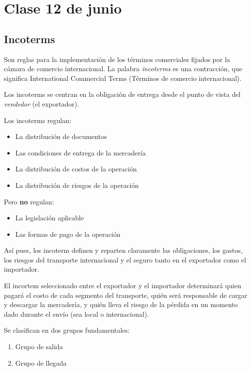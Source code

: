 \section{Clase 12 de junio}

\subsection{Incoterms}

Son reglas para la implementación de los términos comerciales
fijados por la cámara de comercio internacional. 
La palabra \textit{incoterms} es una contracción,
que significa International Commercial Terms
(Términos de comercio internacional).

Los incoterms se centran en la obligación de entrega desde el punto de vista del
\textit{vendedor} (el exportador).

Los incoterms regulan:
\begin{itemize}
      \item La distribución de documentos
      \item Las condiciones de entrega de la mercadería
      \item La distribución de costos de la operación
      \item La distribución de riesgos de la operación 
\end{itemize}

Pero \textbf{no} regulan:
\begin{itemize}
      \item La legislación aplicable
      \item Las formas de pago de la operación 
\end{itemize}

Así pues, 
los incoterm definen y reparten claramente las obligaciones, 
los gastos, 
los riesgos del transporte internacional 
y el seguro tanto en el exportador como el importador.

El incortem seleccionado entre el exportador y el importador
determinará quien pagará el costo de cada segmento del transporte,
quién será responsable de cargar y descargar la mercadería,
y quién lleva el riesgo de la pérdida en un momento dado durante el envío
(sea local o internacional).

Se clasifican en dos grupos fundamentales:
\begin{enumerate}
      \item Grupo de salida
      \item Grupo de llegada
\end{enumerate}

